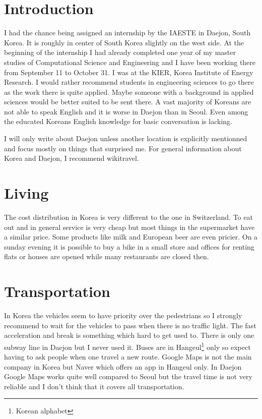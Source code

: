 \section*{Introduction}
I had the chance being assigned an internship by the IAESTE in Daejon, South Korea. It is roughly in center of South Korea slightly on the west side. At the beginning of the internship I had already completed one year of my master studies of Computational Science and Engineering and I have been working there from September 11 to October 31. I was at the KIER, Korea Institute of Energy Research. I would rather recommend students in engineering sciences to go there as the work there is quite applied. Maybe someone with a background in applied sciences would be better suited to be sent there. A vast majority of Koreans are not able to speak English and it is worse in Daejon than in Seoul. Even among the educated Koreans English knowledge for basic conversation is lacking.

I will only write about Daejon unless another location is explicitly mentionned and focus mostly on things that surprised me. For general information about Korea and Daejon, I recommend wikitravel.
\section*{Living}
The cost distribution in Korea is very different to the one in Switzerland. To eat out and in general service is very cheap but most things in the supermarket have a similar price.  Some products like milk and European beer are even pricier. On a sunday evening it is possible to buy a bike in a small store and offices for renting flats or houses are opened while many restaurants are closed then. 
\section*{Transportation}
In Korea the vehicles seem to have priority over the pedestrians so I strongly recommend to wait for the vehicles to pass when there is no traffic light. The fast acceleration and break is something which hard to get used to. There is only one subway line in Daejon but I never used it. Buses are in Hangeul\footnote{Korean alphabet} only so expect having to ask people when one travel a new route. Google Maps is not the main company in Korea but Naver which offers an app in Hangeul only. In Daejon Google Maps works quite well compared to Seoul but the travel time is not very reliable and I don't think that it covers all transportation.


